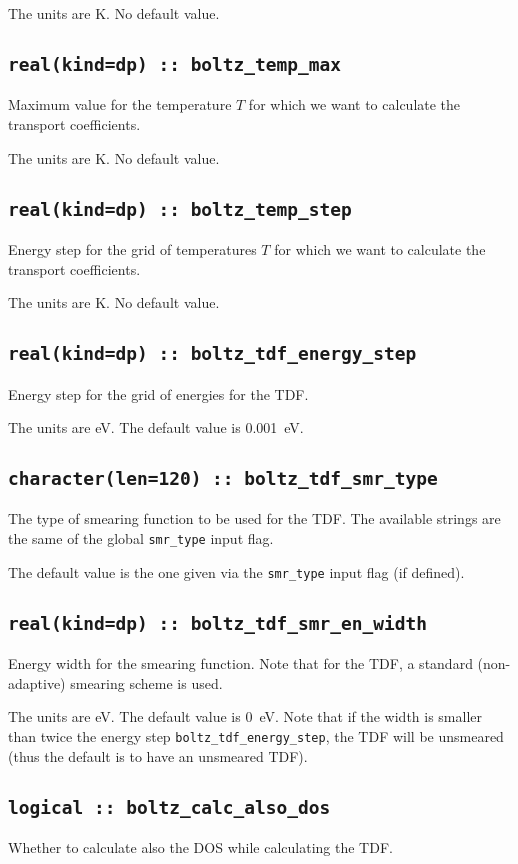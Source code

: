The units are K.
No default value.

\subsection[boltz\_temp\_max]{\tt real(kind=dp) :: boltz\_temp\_max}
Maximum value for the temperature $T$ for which we want to calculate the transport coefficients.

The units are K.
No default value.

\subsection[boltz\_temp\_step]{\tt real(kind=dp) :: boltz\_temp\_step}
Energy step for the grid of temperatures $T$ for which we want to calculate the transport coefficients.

The units are K.
No default value.

\subsection[boltz\_tdf\_energy\_step]{\tt real(kind=dp) :: boltz\_tdf\_energy\_step}
Energy step for the grid of energies for the TDF.

The units are eV.
The default value is 0.001~eV.

\subsection[boltz\_tdf\_smr\_type]{\tt character(len=120) :: boltz\_tdf\_smr\_type}
The type of smearing function to be used for the TDF. The available strings are the same of the global {\tt smr\_type} input flag. 

The default value is the one given via the {\tt smr\_type} input flag (if defined).

\subsection[boltz\_tdf\_smr\_en\_width]{\tt real(kind=dp) :: boltz\_tdf\_smr\_en\_width}
Energy width for the smearing function. Note that for the TDF, a standard (non-adaptive) smearing scheme is used.

The units are eV.
The default value is 0~eV. Note that if the width is smaller than twice the energy step {\tt boltz\_tdf\_energy\_step}, the TDF will be unsmeared (thus the default is to have an unsmeared TDF).

\subsection[boltz\_calc\_also\_dos]{\tt logical :: boltz\_calc\_also\_dos}
Whether to calculate also the DOS while calculating the TDF.

